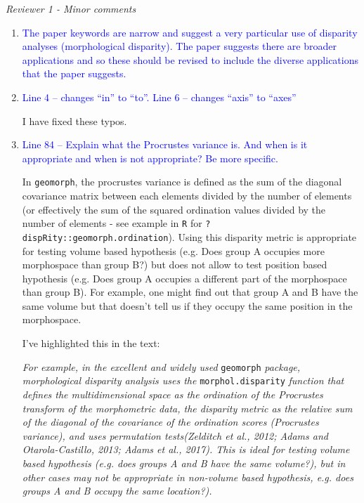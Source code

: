 \documentclass[12pt,letterpaper]{article}
\renewcommand{\subsection}[1]{%
\bigskip
\begin{center}
\begin{large}
\normalfont\itshape #1
\end{large}
\end{center}}
\begin{document}
\subsection{Reviewer 1 - Minor comments}

\begin{enumerate}

\item{\textcolor{blue}{The paper keywords are narrow and suggest a very particular use of disparity analyses (morphological disparity). The paper suggests there are broader applications and so these should be revised to include the diverse applications that the paper suggests. }}


\item{\textcolor{blue}{Line 4 – changes ``in'' to ``to''. Line 6 – changes ``axis'' to ``axes''}}
\label{abstract_typo}

I have fixed these typos.

\item{\textcolor{blue}{Line 84 – Explain what the Procrustes variance is. And when is it appropriate and when is not appropriate? Be more specific.}}

In \texttt{geomorph}, the procrustes variance is defined as the sum of the diagonal covariance matrix between each elements divided by the number of elements (or effectively the sum of the squared ordination values divided by the number of elements - see example in \texttt{R} for \texttt{?dispRity::geomorph.ordination}).
Using this disparity metric is appropriate for testing volume based hypothesis (e.g. Does group A occupies more morphospace than group B?) but does not allow to test position based hypothesis (e.g. Does group A occupies a different part of the morphospace than group B).
For example, one might find out that group A and B have the same volume but that doesn't tell us if they occupy the same position in the morphospace.

I've highlighted this in the text:

\textit{For example, in the excellent and widely used} \texttt{geomorph} \textit{package, morphological disparity analysis uses the} \texttt{morphol.disparity} \textit{function that defines the multidimensional space as the ordination of the Procrustes transform of the morphometric data, the disparity metric as the relative sum of the diagonal of the covariance of the ordination scores (Procrustes variance), and uses permutation tests(Zelditch et al., 2012; Adams and Otarola-Castillo, 2013; Adams et al., 2017). This is ideal for testing volume based hypothesis (e.g. does groups A and B have the same volume?), but in other cases may not be appropriate in non-volume based hypothesis, e.g. does groups A and B occupy the same location?).}


\end{enumerate}
\end{document}
